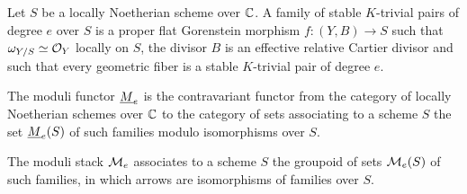 \documentclass[table,x11names]{amsart}
\newcommand\cme{\cM_e}
\newcommand\ume{\uM_e}
\begin{document}
\begin{definition}\label{def:family-stable-k3}
  Let $S$ be a locally Noetherian scheme over ${\mathbb C}$.  A family of
  stable $K$-trivial pairs of degree $e$ over $S$ is a proper flat
  Gorenstein morphism $f\colon (Y,B)\to S$ such that
  $\omega_{Y/S}\simeq {\mathcal O}_Y$ locally on $S$, the divisor $B$ is an
  effective relative Cartier divisor and such that every geometric
  fiber is a stable $K$-trivial pair of degree $e$.

  The moduli functor $\ume$ is the contravariant functor from
  the category of locally Noetherian schemes over ${\mathbb C}$ to the
  category of sets associating to a scheme $S$ the set $\ume(S)$
  of such families modulo isomorphisms over
  $S$.
  
  The moduli stack $\cme$ associates to a scheme $S$ the
  groupoid of sets $\cme(S)$ of such families, in which arrows are
  isomorphisms of families over $S$.
\end{definition}
\end{document}
